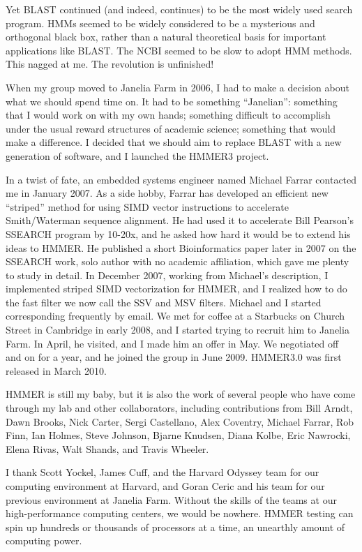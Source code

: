 Yet BLAST continued (and indeed, continues) to be the most widely used
search program. HMMs seemed to be widely considered to be a mysterious
and orthogonal black box, rather than a natural theoretical basis for
important applications like BLAST. The NCBI seemed to be slow to adopt
HMM methods. This nagged at me. The revolution is unfinished!

When my group moved to Janelia Farm in 2006, I had to make a decision
about what we should spend time on. It had to be something
``Janelian'': something that I would work on with my own hands;
something difficult to accomplish under the usual reward structures of
academic science; something that would make a difference. I decided
that we should aim to replace BLAST with a new generation of software,
and I launched the HMMER3 project.

In a twist of fate, an embedded systems engineer named Michael Farrar
contacted me in January 2007. As a side hobby, Farrar has developed an
efficient new ``striped'' method for using SIMD vector instructions to
accelerate Smith/Waterman sequence alignment. He had used it to
accelerate Bill Pearson's SSEARCH program by 10-20x, and he asked how
hard it would be to extend his ideas to HMMER. He published a short
Bioinformatics paper later in 2007 on the SSEARCH work, solo author
with no academic affiliation, which gave me plenty to study in
detail. In December 2007, working from Michael's description, I
implemented striped SIMD vectorization for HMMER, and I realized how
to do the fast filter we now call the SSV and MSV filters. Michael and
I started corresponding frequently by email. We met for coffee at a
Starbucks on Church Street in Cambridge in early 2008, and I started
trying to recruit him to Janelia Farm. In April, he visited, and I
made him an offer in May. We negotiated off and on for a year, and he
joined the group in June 2009. HMMER3.0 was first released in March
2010. 

HMMER is still my baby, but it is also the work of several people who
have come through my lab and other collaborators, including
contributions from Bill Arndt, Dawn Brooks, Nick Carter, Sergi
Castellano, Alex Coventry, Michael Farrar, Rob Finn, Ian Holmes, Steve
Johnson, Bjarne Knudsen, Diana Kolbe, Eric Nawrocki, Elena Rivas, Walt
Shands, and Travis Wheeler. 

I thank Scott Yockel, James Cuff, and the Harvard Odyssey team for our
computing environment at Harvard, and Goran Ceric and his team for our
previous environment at Janelia Farm.  Without the skills of the teams
at our high-performance computing centers, we would be nowhere. HMMER
testing can spin up hundreds or thousands of processors at a time, an
unearthly amount of computing power.

